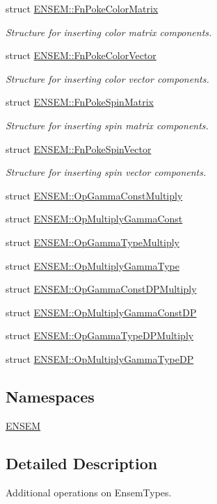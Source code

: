 \begin{DoxyCompactItemize}
struct \mbox{\hyperlink{structENSEM_1_1FnPokeColorMatrix}{E\+N\+S\+E\+M\+::\+Fn\+Poke\+Color\+Matrix}}
\begin{DoxyCompactList}\small\item\em Structure for inserting color matrix components. \end{DoxyCompactList}\item 
struct \mbox{\hyperlink{structENSEM_1_1FnPokeColorVector}{E\+N\+S\+E\+M\+::\+Fn\+Poke\+Color\+Vector}}
\begin{DoxyCompactList}\small\item\em Structure for inserting color vector components. \end{DoxyCompactList}\item 
struct \mbox{\hyperlink{structENSEM_1_1FnPokeSpinMatrix}{E\+N\+S\+E\+M\+::\+Fn\+Poke\+Spin\+Matrix}}
\begin{DoxyCompactList}\small\item\em Structure for inserting spin matrix components. \end{DoxyCompactList}\item 
struct \mbox{\hyperlink{structENSEM_1_1FnPokeSpinVector}{E\+N\+S\+E\+M\+::\+Fn\+Poke\+Spin\+Vector}}
\begin{DoxyCompactList}\small\item\em Structure for inserting spin vector components. \end{DoxyCompactList}\item 
struct \mbox{\hyperlink{structENSEM_1_1OpGammaConstMultiply}{E\+N\+S\+E\+M\+::\+Op\+Gamma\+Const\+Multiply}}
\item 
struct \mbox{\hyperlink{structENSEM_1_1OpMultiplyGammaConst}{E\+N\+S\+E\+M\+::\+Op\+Multiply\+Gamma\+Const}}
\item 
struct \mbox{\hyperlink{structENSEM_1_1OpGammaTypeMultiply}{E\+N\+S\+E\+M\+::\+Op\+Gamma\+Type\+Multiply}}
\item 
struct \mbox{\hyperlink{structENSEM_1_1OpMultiplyGammaType}{E\+N\+S\+E\+M\+::\+Op\+Multiply\+Gamma\+Type}}
\item 
struct \mbox{\hyperlink{structENSEM_1_1OpGammaConstDPMultiply}{E\+N\+S\+E\+M\+::\+Op\+Gamma\+Const\+D\+P\+Multiply}}
\item 
struct \mbox{\hyperlink{structENSEM_1_1OpMultiplyGammaConstDP}{E\+N\+S\+E\+M\+::\+Op\+Multiply\+Gamma\+Const\+DP}}
\item 
struct \mbox{\hyperlink{structENSEM_1_1OpGammaTypeDPMultiply}{E\+N\+S\+E\+M\+::\+Op\+Gamma\+Type\+D\+P\+Multiply}}
\item 
struct \mbox{\hyperlink{structENSEM_1_1OpMultiplyGammaTypeDP}{E\+N\+S\+E\+M\+::\+Op\+Multiply\+Gamma\+Type\+DP}}
\end{DoxyCompactItemize}
\subsection*{Namespaces}
\begin{DoxyCompactItemize}
\item 
 \mbox{\hyperlink{namespaceENSEM}{E\+N\+S\+EM}}
\end{DoxyCompactItemize}


\subsection{Detailed Description}
Additional operations on Ensem\+Types. 

